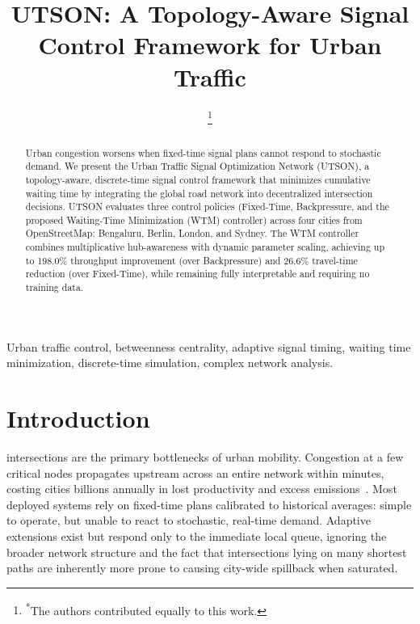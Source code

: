 \documentclass[letterpaper, conference]{IEEEtran}
\begin{document}
\addtolength{\tabcolsep}{-6pt}

\title{UTSON: A Topology-Aware Signal Control Framework for Urban Traffic}

\author{
\thanks{\textsuperscript{*}The authors contributed equally to this work.}}

\maketitle

\begin{abstract}
Urban congestion worsens when fixed-time signal plans cannot respond to stochastic demand. We present the Urban Traffic Signal Optimization Network (UTSON), a topology-aware, discrete-time signal control framework that minimizes cumulative waiting time by integrating the global road network into decentralized intersection decisions. UTSON evaluates three control policies (Fixed-Time, Backpressure, and the proposed Waiting-Time Minimization (WTM) controller) across four cities from OpenStreetMap: Bengaluru, Berlin, London, and Sydney. The WTM controller combines multiplicative hub-awareness with dynamic parameter scaling, achieving up to 198.0\% throughput improvement (over Backpressure) and 26.6\% travel-time reduction (over Fixed-Time), while remaining fully interpretable and requiring no training data.
\end{abstract}

\begin{IEEEkeywords}
Urban traffic control, betweenness centrality, adaptive signal timing, waiting time minimization, discrete-time simulation, complex network analysis.
\end{IEEEkeywords}

\section{Introduction}
\label{section_Introduction}
 intersections are the primary bottlenecks of urban mobility. Congestion at a few critical nodes propagates upstream across an entire network within minutes, costing cities billions annually in lost productivity and excess emissions~\cite{ibe2013markov}. Most deployed systems rely on fixed-time plans calibrated to historical averages: simple to operate, but unable to react to stochastic, real-time demand. Adaptive extensions exist but respond only to the immediate local queue, ignoring the broader network structure and the fact that intersections lying on many shortest paths are inherently more prone to causing city-wide spillback when saturated.
\end{document}
